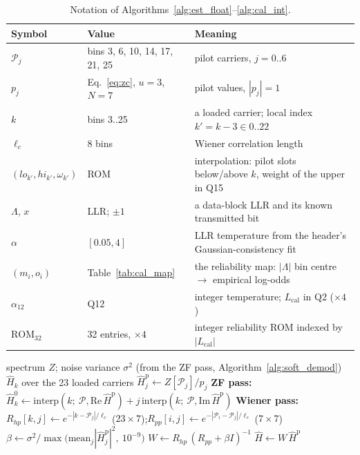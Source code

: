 \begin{table}[H]
    \centering
    \caption{Notation of Algorithms~\ref{alg:est_float}--\ref{alg:cal_int}.}
    \label{tab:cal_notation}
    \small
    \begin{tabular}{@{}lp{4.2cm}p{7.8cm}@{}}
    \toprule
    \textbf{Symbol} & \textbf{Value} & \textbf{Meaning} \\
    \midrule
    $\mathcal{P}_j$ & bins 3, 6, 10, 14, 17, 21, 25 & pilot carriers, $j = 0..6$ \\
    $p_j$ & Eq.~\eqref{eq:zc}, $u{=}3$, $N{=}7$ & pilot values, $|p_j| = 1$ \\
    $k$ & bins 3..25 & a loaded carrier; local index $k' = k - 3 \in 0..22$ \\
    $\ell_c$ & 8 bins & Wiener correlation length \\
    $(lo_{k'}, hi_{k'}, \omega_{k'})$ & ROM & interpolation: pilot slots below/above $k$, weight of the upper in Q15 \\
    $\Lambda$, $x$ & LLR; $\pm1$ & a data-block LLR and its known transmitted bit \\
    $\alpha$ & $[0.05, 4]$ & LLR temperature from the header's Gaussian-consistency fit \\
    $(m_i, o_i)$ & Table~\ref{tab:cal_map} & the reliability map: $|\Lambda|$ bin centre $\to$ empirical log-odds \\
    $\alpha_{12}$ & Q12 & integer temperature; $L_{\mathrm{cal}}$ in Q2 ($\times 4$) \\
    $\mathrm{ROM}_{32}$ & 32 entries, $\times 4$ & integer reliability ROM indexed by $|L_{\mathrm{cal}}|$ \\
    \bottomrule
    \end{tabular}
\end{table}

\begin{algorithm}[H]
\caption{Float channel estimate (\texttt{\_channel\_estimate\_zf}, \texttt{\_channel\_estimate\_wiener}), per symbol.}
\label{alg:est_float}
\begin{algorithmic}[1]
\Require spectrum $Z$; noise variance $\sigma^2$ (from the ZF pass, Algorithm~\ref{alg:soft_demod})
\Ensure $\hat H_k$ over the 23 loaded carriers
\State $\hat H^{\mathrm{p}}_j \gets Z[\mathcal{P}_j] / p_j$ 
\State \textbf{ZF pass:} $\hat H^{0}_k \gets \mathrm{interp}(k;\ \mathcal{P}, \mathrm{Re}\,\hat H^{\mathrm{p}}) + j\,\mathrm{interp}(k;\ \mathcal{P}, \mathrm{Im}\,\hat H^{\mathrm{p}})$ 
\State \textbf{Wiener pass:} $R_{hp}[k, j] \gets e^{-|k - \mathcal{P}_j| / \ell_c}$ ($23 \times 7$);\quad $R_{pp}[i, j] \gets e^{-|\mathcal{P}_i - \mathcal{P}_j| / \ell_c}$ ($7 \times 7$)
\State $\beta \gets \sigma^2 \big/ \max\big(\mathrm{mean}_j |\hat H^{\mathrm{p}}_j|^2,\ 10^{-9}\big)$ 
\State $W \gets R_{hp}\,(R_{pp} + \beta I)^{-1}$ 
\State \Return $\hat H \gets W\, \hat H^{\mathrm{p}}$
\end{algorithmic}
\end{algorithm}

